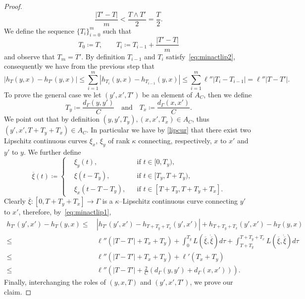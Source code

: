\documentclass[10pt,a4paper]{amsart}
\newcommand{\ovxi}{\overline\xi}
\begin{document}
\begin{proof}
        \begin{equation*}
            \frac{|T'-T|}m<\frac{T\wedge T'}2=\frac T2.
        \end{equation*}
        We define the sequence $\{T_i\}_{i=0}^m$ such that
        \begin{equation*}
            T_0\coloneqq T,\qquad T_i\coloneqq T_{i-1}+\frac{|T'-T|}m
        \end{equation*}
        and observe that $T_m=T'$. By definition $T_{i-1}$ and $T_i$ satisfy~\cref{eq:minactlip2}, consequently we have from the previous step that
        \begin{equation*}
            |h_T(y,x)-h_{T'}(y,x)|\le\sum_{i=1}^m\left|h_{T_i}(y,x)-h_{T_{i-1}}(y,x)\right|\le\sum_{i=1}^m\ell''|T_i-T_{i-1}|=\ell''\left|T-T'\right|.
        \end{equation*}
        To prove the general case we let $(y',x',T')$ be an element of $A_C$, then we define
        \begin{equation*}
            T_y\coloneqq\frac{d_\Gamma(y,y')}C\quad\text{and}\quad T_x\coloneqq\frac{d_\Gamma(x,x')}C.
        \end{equation*}
        We point out that by definition $(y,y',T_y),(x,x',T_x)\in A_C$, thus $(y',x',T+T_y+T_x)\in A_C$. In particular we have by \cref{lipcur} that there exist two Lipschitz continuous curves $\xi_x$, $\xi_y$ of rank $\kappa$ connecting, respectively, $x$ to $x'$ and $y'$ to $y$. We further define
        \begin{equation*}
            \ovxi(t)\coloneqq\left\{
            \begin{aligned}
                &\xi_y(t),&&\text{if }t\in[0,T_y),\\
                &\xi(t-T_y),&&\text{if }t\in[T_y,T+T_y),\\
                &\xi_x\left(t-T-T_y\right),&&\text{if }t\in[T+T_y,T+T_y+T_x].
            \end{aligned}
            \right.
        \end{equation*}
        Clearly $\ovxi:[0,T+T_y+T_x]\to\Gamma$ is a $\kappa$--Lipschitz continuous curve connecting $y'$ to $x'$, therefore, by~\cref{eq:minactlip1},
        \begin{align*}
            h_{T'}\left(y',x'\right)-h_T(y,x)\le&\,\left|h_{T'}\left(y',x'\right)-h_{T+T_y+T_x}\left(y',x'\right)\right|+h_{T+T_y+T_x}\left(y',x'\right)-h_T(y,x)\\
            \le&\,\ell''\left(\left|T-T'\right|+T_x+T_y\right)+\int_0^{T_y}L\left(\ovxi,\dot\ovxi\right)d\tau+\int_{T+T_y}^{T+T_y+T_x}L\left(\ovxi,\dot\ovxi\right)d\tau\\
            \le&\,\ell''\left(\left|T-T'\right|+T_x+T_y\right)+\ell'(T_x+T_y)\\
            \le&\,\ell''\left(\left|T-T'\right|+\frac2C\left(d_\Gamma\left(y,y'\right)+d_\Gamma\left(x,x'\right)\right)\right).
        \end{align*}
        Finally, interchanging the roles of $(y,x,T)$ and $(y',x',T')$, we prove our claim.
    \end{proof}
\end{document}
